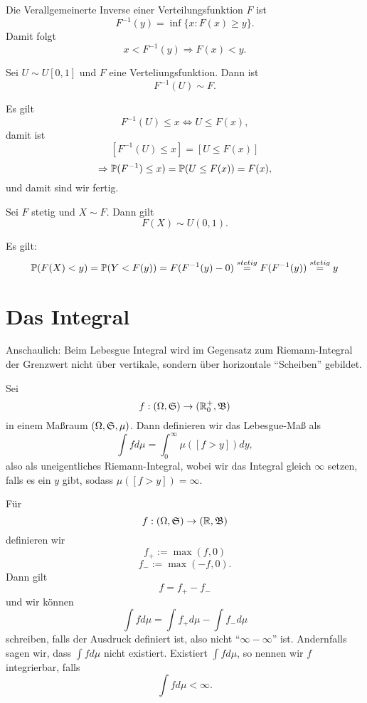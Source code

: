 				\begin{defi}
					Die Verallgemeinerte Inverse einer Verteilungsfunktion $F$ ist 
					\[ F^{-1}(y)=\inf \{x: F(x)\ge y\}. \]
					Damit folgt 
					\[ x<F^{-1}(y)\Rightarrow F(x)<y. \]
				\end{defi}
				
				\begin{satz}
					Sei $U\sim U[0,1]$ und $F$ eine Verteliungsfunktion. Dann ist
					\[ F^{-1}(U)\sim F. \] 
				\end{satz}
				
				\begin{bew}
					Es gilt
					\[ F^{-1}(U)\le x\Leftrightarrow U\le F(x), \]
					damit ist
					\[ [F^{-1}(U)\le x]=[U\le F(x)] \]
					\[ \Rightarrow \P(F^{-1})\le x)=\P(U\le F(x))=F(x), \]
					und damit sind wir fertig. 
				\end{bew}
				
				\begin{satz}
					Sei $F$ stetig und $X\sim F$. Dann gilt
					\[ F(X)\sim U(0,1). \]
				\end{satz}
				
				\begin{bew}
					Es gilt:
					\[ \P(F(X)<y)=\P(Y<F(y))=F(F^{-1}(y)-0)\stackrel{stetig}{=}F(F^{-1}(y))\stackrel{stetig}{=}y \]
				\end{bew}
				
		\section{Das Integral}
			Anschaulich: Beim Lebesgue Integral wird im Gegensatz zum Riemann-Integral der Grenzwert nicht über vertikale, sondern über horizontale "`Scheiben"' gebildet. 
			\begin{defi}
				Sei 
				\[ f:(\Omega,\mf{S})\to (\R_0^+, \mf{B}) \]
				in einem Maßraum $(\Omega, \mf{S}, \mu)$. Dann definieren wir das Lebesgue-Maß als
				\[ \int fd\mu=\int_0^\infty \mu([f>y])dy, \]
				also als uneigentliches Riemann-Integral, wobei wir das Integral gleich $\infty$ setzen, falls es ein $y$ gibt, sodass $\mu([f>y])=\infty$. 
			\end{defi}
			
			\begin{defi}[Allgemeiner]
				Für
				\[ f:(\Omega,\mf{S})\to (\R, \mf{B}) \]
				definieren wir 
				\[ f_+:=\max (f,0) \]
				\[ f_-:=\max(-f,0). \]
				Dann gilt 
				\[ f=f_+-f_- \]
				und wir können 
				\[ \int fd\mu=\int f_+d\mu-\int f_-d\mu \]
				schreiben, falls der Ausdruck definiert ist, also nicht "`$\infty-\infty$"' ist. Andernfalls sagen wir, dass $\int f d\mu$ nicht existiert. Existiert $\int fd\mu$, so nennen wir $f$ integrierbar, falls 
				\[ \int fd\mu<\infty. \] 
			\end{defi}
			
